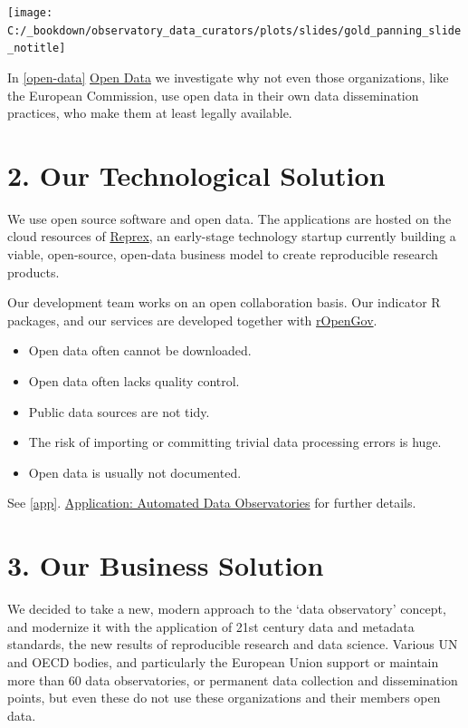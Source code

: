 \documentclass[
  a4paper,
  openany, a4paper, oneside]{book}
\providecommand{\tightlist}{%
  \setlength{\itemsep}{0pt}\setlength{\parskip}{0pt}}
\begin{document}
\begin{center}\texttt{[image: C:/\_bookdown/observatory\_data\_curators/plots/slides/gold\_panning\_slide\_notitle]} \end{center}

In \ref{open-data} \protect\hyperlink{open-data}{Open Data} we investigate why not even those organizations, like the European Commission, use open data in their own data dissemination practices, who make them at least legally available.

\hypertarget{tech-solution}{%
\section*{2. Our Technological Solution}\label{tech-solution}}

We use open source software and open data. The applications are hosted on the cloud resources of \protect\hyperlink{reprex}{Reprex}, an early-stage technology startup currently building a viable, open-source, open-data business model to create reproducible research products.

Our development team works on an open collaboration basis. Our indicator R packages, and our services are developed together with \href{https://music.dataobservatory.eu/author/ropengov/}{rOpenGov}.

\begin{itemize}
\tightlist
\item
  Open data often cannot be downloaded.
\item
  Open data often lacks quality control.
\item
  Public data sources are not tidy.
\item
  The risk of importing or committing trivial data processing errors is huge.
\item
  Open data is usually not documented.
\end{itemize}

See \ref{app}. \protect\hyperlink{app}{Application: Automated Data Observatories} for further details.

\hypertarget{business-solution}{%
\section*{3. Our Business Solution}\label{business-solution}}

We decided to take a new, modern approach to the `data observatory' concept, and modernize it with the application of 21st century data and metadata standards, the new results of reproducible research and data science. Various UN and OECD bodies, and particularly the European Union support or maintain more than 60 data observatories, or permanent data collection and dissemination points, but even these do not use these organizations and their members open data.
\end{document}
